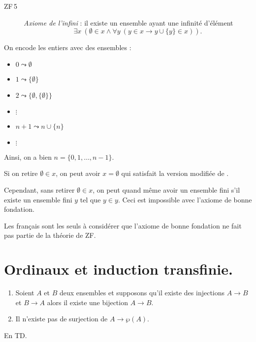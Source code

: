 \documentclass[./main]{subfiles}
\begin{document}
  \begin{description}
    \item[ZF\,5] \label{ZF5}\textit{Axiome de l'infini} : il existe un ensemble ayant une infinité d'élément
      \[
      \exists x \: (\emptyset \in x \land \forall y \: (y \in x \to y \cup \{y\} \in x ))
      .\]
  \end{description}

  On encode les entiers avec des ensembles :
  \begin{itemize}
    \item $0 \leadsto \emptyset$
    \item $1 \leadsto \{\emptyset\} $
    \item $2 \leadsto \{\emptyset, \{\emptyset\}\}  $
    \item \quad \quad $\vdots$
    \item $n+1 \leadsto n \cup \{n\}$
    \item \quad \quad $\vdots$
  \end{itemize}

  Ainsi, on a bien $n  =\{0, 1, \ldots, n-1\}$.

  \begin{rmk}
    Si on retire $\emptyset \in x$, on peut avoir $x = \emptyset$ qui satisfait la version modifiée de .

    Cependant, sans retirer $\emptyset \in x$, on peut quand même avoir un ensemble fini s'il existe un ensemble fini $y$ tel que $y \in y$.
    Ceci est impossible avec l'axiome de bonne fondation.
  \end{rmk}

  \begin{rmk}
    Les français sont les seuls à considérer que l'axiome de bonne fondation ne fait pas partie de la théorie de ZF.
  \end{rmk}

  \section{Ordinaux et induction transfinie.}


  \begin{thm}[Cantor]
    \begin{enumerate}
      \item Soient $A$ et $B$ deux ensembles et supposons qu'il existe des injections $A \to B$ et $B \to A$ alors il existe une bijection $A \to B$.
      \item Il n'existe pas de surjection de $A \to \wp(A)$.
    \end{enumerate}
  \end{thm}
  \begin{prv}
    En TD.
  \end{prv}
\end{document}
